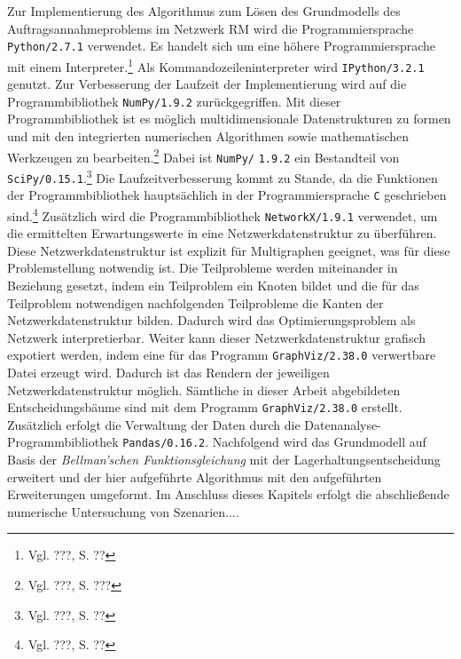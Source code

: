 Zur Implementierung des Algorithmus zum Lösen des Grundmodells des Auftragsannahmeproblems im Netzwerk RM wird die Programmiersprache \texttt{Python/2.7.1} verwendet. Es handelt sich um eine höhere Programmiersprache mit einem Interpreter.\footnote{Vgl. ???, S. ??} Als  Kommandozeileninterpreter wird \texttt{IPython/3.2.1} genutzt. Zur Verbesserung der Laufzeit der Implementierung wird auf die Programmbibliothek \texttt{NumPy/}\texttt{1.9.2} zurückgegriffen. Mit dieser Programmbibliothek ist es möglich multidimensionale Datenstrukturen zu formen und mit den integrierten numerischen Algorithmen sowie mathematischen Werkzeugen zu bearbeiten.\footnote{Vgl. ???, S. ???} Dabei ist \texttt{NumPy/} \texttt{1.9.2} ein Bestandteil von \texttt{SciPy/0.15.1}.\footnote{Vgl. ???, S. ??} Die Laufzeitverbesserung kommt zu Stande, da die Funktionen der Programmbibliothek hauptsächlich in der Programmiersprache \texttt{C} geschrieben sind.\footnote{Vgl. ???, S. ??} Zusätzlich wird die Programmbibliothek \texttt{NetworkX/1.9.1} verwendet, um die ermittelten Erwartungswerte in eine Netzwerkdatenstruktur zu überführen. Diese Netzwerkdatenstruktur ist explizit für Multigraphen geeignet, was für diese Problemstellung notwendig ist. Die Teilprobleme werden miteinander in Beziehung gesetzt, indem ein Teilproblem ein Knoten bildet und die für das Teilproblem notwendigen nachfolgenden Teilprobleme die Kanten der Netzwerkdatenstruktur bilden. Dadurch wird das Optimierungsproblem als Netzwerk interpretierbar. Weiter kann dieser Netzwerkdatenstruktur grafisch expotiert werden, indem eine für das Programm \texttt{GraphViz/2.38.0} verwertbare Datei erzeugt wird. Dadurch ist das Rendern der jeweiligen Netzwerkdatenstruktur möglich. Sämtliche in dieser Arbeit abgebildeten Entscheidungsbäume sind mit dem Programm \texttt{GraphViz/2.38.0} erstellt. Zusätzlich erfolgt die Verwaltung der Daten durch die Datenanalyse-Programmbibliothek \texttt{Pandas/0.16.2}. Nachfolgend wird das Grundmodell auf Basis der \textit{Bellman'schen Funktionsgleichung} mit der Lagerhaltungsentscheidung erweitert und der hier aufgeführte Algorithmus mit den aufgeführten Erweiterungen umgeformt. Im Anschluss dieses Kapitels erfolgt die abschließende numerische Untersuchung von Szenarien....



